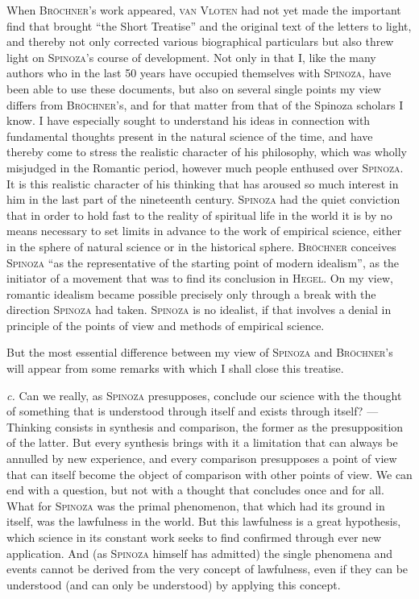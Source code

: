 \documentclass[12pt]{article}
\begin{document}
When \textsc{Bröchner}'s work appeared, \textsc{van Vloten} had not yet made the important find that
brought ``the Short Treatise'' and the original text of the letters to light, and thereby not only
corrected various biographical particulars but also threw light on \textsc{Spinoza}'s course of
development. Not only in that I, like the many authors who in the last 50 years have occupied
themselves with \textsc{Spinoza}, have been able to use these documents, but also on several single
points my view differs from \textsc{Bröchner}'s, and for that matter from that of the Spinoza
scholars I know. I have especially sought to understand his ideas in connection with fundamental
thoughts present in the natural science of the time, and have thereby come to stress the realistic
character of his philosophy, which was wholly misjudged in the Romantic period, however much people
enthused over \textsc{Spinoza}. It is this realistic character of his thinking that has aroused so
much interest in him in the last part of the nineteenth century. \textsc{Spinoza} had the quiet
conviction that in order to hold fast to the reality of spiritual life in the world it is by no
means necessary to set limits in advance to the work of empirical science, either in the sphere of
natural science or in the historical sphere. \textsc{Bröchner} conceives \textsc{Spinoza} ``as the
representative of the starting point of modern idealism'', as the initiator of a movement that was
to find its conclusion in \textsc{Hegel}. On my view, romantic idealism became possible precisely
only through a break with the direction \textsc{Spinoza} had taken. \textsc{Spinoza} is no
idealist, if that involves a denial in principle of the points of view and methods of empirical
science.

But the most essential difference between my view of \textsc{Spinoza} and \textsc{Bröchner}'s will
appear from some remarks with which I shall close this treatise.

\textit{c.} Can we really, as \textsc{Spinoza} presupposes, conclude our science with the thought of
something that is understood through itself and exists through itself? --- Thinking consists in
synthesis and comparison, the former as the presupposition of the latter. But every synthesis
brings with it a limitation that can always be annulled by new experience, and every comparison
presupposes a point of view that can itself become the object of comparison with other points of
view. We can end with a question, but not with a thought that concludes once and for all. What for %
\textsc{Spinoza} was the primal phenomenon, that which had its ground in itself, was the lawfulness
in the world. But this lawfulness is a great hypothesis, which science in its constant work seeks to
find confirmed through ever new application. And (as \textsc{Spinoza} himself has admitted) the
single phenomena and events cannot be derived from the very concept of lawfulness, even if they can
be understood (and can only be understood) by applying this concept.
\end{document}
